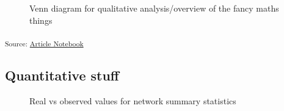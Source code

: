 \documentclass[
]{agujournal2019}
\begin{document}
\begin{figure}[H]


\caption{\label{fig-venn}Venn diagram for qualitative analysis/overview
of the fancy maths things}

\end{figure}%

\textsubscript{Source:
\href{https://BecksLab.github.io/ms_t_is_for_topology/index.qmd.html}{Article
Notebook}}

\subsection{Quantitative stuff}\label{quantitative-stuff}

\begin{figure}[H]


\caption{\label{fig-topology}Real vs observed values for network summary
statistics}

\end{figure}%
\end{document}
